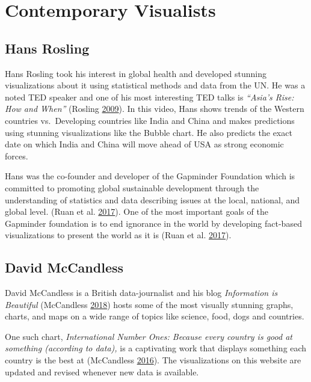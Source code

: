 \documentclass[]{book}
\theoremstyle{definition}
\theoremstyle{definition}
\theoremstyle{definition}
\theoremstyle{remark}
\begin{document}
\section{Contemporary Visualists}\label{contemporary-visualists}

\subsection{Hans Rosling}\label{hans-rosling}

Hans Rosling took his interest in global health and developed stunning
visualizations about it using statistical methods and data from the UN.
He was a noted TED speaker and one of his most interesting TED talks is
\emph{``Asia's Rise: How and When''} (Rosling
\protect\hyperlink{ref-hans}{2009}). In this video, Hans shows trends of
the Western countries vs.~Developing countries like India and China and
makes predictions using stunning visualizations like the Bubble chart.
He also predicts the exact date on which India and China will move ahead
of USA as strong economic forces.

Hans was the co-founder and developer of the Gapminder Foundation which
is committed to promoting global sustainable development through the
understanding of statistics and data describing issues at the local,
national, and global level. (Ruan et al.
\protect\hyperlink{ref-gapminder}{2017}). One of the most important
goals of the Gapminder foundation is to end ignorance in the world by
developing fact-based visualizations to present the world as it is (Ruan
et al. \protect\hyperlink{ref-gapminder}{2017}).

\subsection{David McCandless}\label{david-mccandless}

David McCandless is a British data-journalist and his blog
\emph{Information is Beautiful} (McCandless
\protect\hyperlink{ref-info_beautiful}{2018}) hosts some of the most
visually stunning graphs, charts, and maps on a wide range of topics
like science, food, dogs and countries.

One such chart, \emph{International Number Ones: Because every country
is good at something (according to data),} is a captivating work that
displays something each country is the best at (McCandless
\protect\hyperlink{ref-country_chart}{2016}). The visualizations on this
website are updated and revised whenever new data is available.
\end{document}
